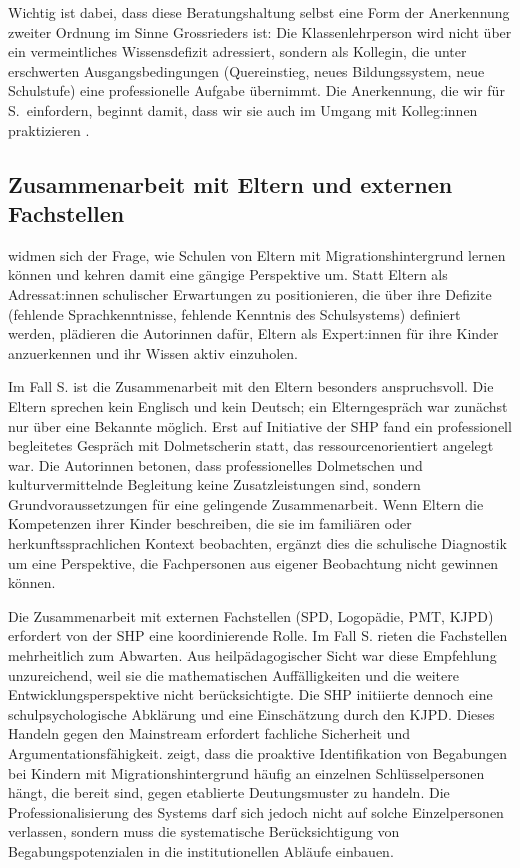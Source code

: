 \documentclass[ngerman, a4paper]{article}
\begin{document}
Wichtig ist dabei, dass diese Beratungshaltung selbst eine Form der
Anerkennung zweiter Ordnung im Sinne Grossrieders ist: Die
Klassenlehrperson wird nicht über ein vermeintliches Wissensdefizit
adressiert, sondern als Kollegin, die unter erschwerten
Ausgangsbedingungen (Quereinstieg, neues Bildungssystem, neue Schulstufe)
eine professionelle Aufgabe übernimmt. Die Anerkennung, die wir für S.\
einfordern, beginnt damit, dass wir sie auch im Umgang mit Kolleg:innen
praktizieren \parencite{grossrieder2010anerkennung}.

\subsection{Zusammenarbeit mit Eltern und externen Fachstellen}

\textcite{kosoroklabhart2021voneltern} widmen sich der Frage, wie Schulen
von Eltern mit Migrationshintergrund lernen können und kehren damit eine gängige
Perspektive um. Statt Eltern als Adressat:innen schulischer Erwartungen zu
positionieren, die über ihre Defizite (fehlende Sprachkenntnisse, fehlende
Kenntnis des Schulsystems) definiert werden, plädieren die Autorinnen dafür, Eltern
als Expert:innen für ihre Kinder anzuerkennen und ihr Wissen aktiv einzuholen.

Im Fall S. ist die Zusammenarbeit mit den Eltern besonders anspruchsvoll. Die Eltern
sprechen kein Englisch und kein Deutsch; ein Elterngespräch war zunächst nur über
eine Bekannte möglich. Erst auf Initiative der SHP fand ein professionell
begleitetes Gespräch mit Dolmetscherin statt, das ressourcenorientiert angelegt war.
Die Autorinnen betonen, dass professionelles Dolmetschen und
kulturvermittelnde Begleitung keine Zusatzleistungen sind, sondern Grundvoraussetzungen
für eine gelingende Zusammenarbeit. Wenn Eltern die Kompetenzen ihrer Kinder
beschreiben, die sie im familiären oder herkunftssprachlichen Kontext beobachten,
ergänzt dies die schulische Diagnostik um eine Perspektive, die Fachpersonen aus
eigener Beobachtung nicht gewinnen können.

Die Zusammenarbeit mit externen Fachstellen (SPD, Logopädie, PMT, KJPD)
erfordert von der SHP eine koordinierende Rolle. Im Fall S. rieten die
Fachstellen mehrheitlich zum Abwarten. Aus heilpädagogischer Sicht war diese
Empfehlung unzureichend, weil sie die mathematischen Auffälligkeiten und die
weitere Entwicklungsperspektive nicht berücksichtigte. Die SHP initiierte
dennoch eine schulpsychologische Abklärung und eine Einschätzung durch den KJPD.
Dieses Handeln gegen den Mainstream erfordert fachliche Sicherheit und
Argumentationsfähigkeit. \textcite[S.\,185--194]{leikhof2021jugendliche} zeigt, dass die proaktive Identifikation von
Begabungen bei Kindern mit Migrationshintergrund häufig an einzelnen
Schlüsselpersonen hängt, die bereit sind, gegen etablierte Deutungsmuster zu
handeln. Die Professionalisierung des Systems darf sich jedoch nicht auf solche
Einzelpersonen verlassen, sondern muss die systematische Berücksichtigung
von Begabungspotenzialen in die institutionellen Abläufe einbauen.
\end{document}
